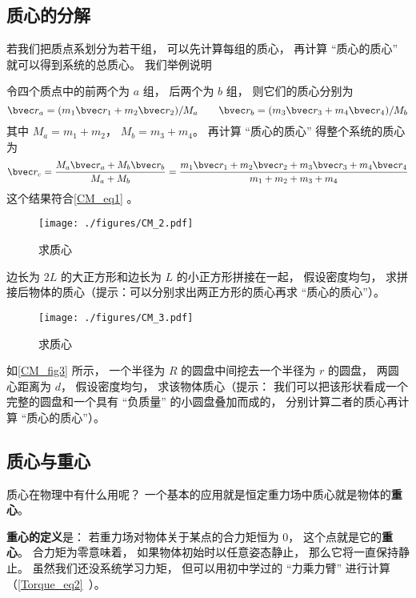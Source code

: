 \subsection{质心的分解}\label{CM_sub1}
若我们把质点系划分为若干组， 可以先计算每组的质心， 再计算 “质心的质心” 就可以得到系统的总质心。 我们举例说明
\begin{example}{}
令四个质点中的前两个为 $a$ 组， 后两个为 $b$ 组， 则它们的质心分别为
\begin{equation}
\bvec r_a = (m_1 \bvec r_1 + m_2 \bvec r_2)/M_a
\qquad
\bvec r_b = (m_3 \bvec r_3 + m_4 \bvec r_4)/M_b
\end{equation}
其中 $M_a = m_1 + m_2$， $M_b = m_3 + m_4$。 再计算 “质心的质心” 得整个系统的质心为
\begin{equation}
\bvec r_c = \frac{M_a \bvec r_a + M_b \bvec r_b}{M_a + M_b} = \frac{m_1 \bvec r_1 + m_2 \bvec r_2 + m_3 \bvec r_3 + m_4 \bvec r_4}{m_1 + m_2 + m_3 + m_4}
\end{equation}
这个结果符合\autoref{CM_eq1} 。
\end{example}

\begin{exercise}{}
\begin{figure}[ht]
\centering
\texttt{[image: ./figures/CM\_2.pdf]}
\caption{求质心} \label{CM_fig2}
\end{figure}
边长为 $2L$ 的大正方形和边长为 $L$ 的小正方形拼接在一起， 假设密度均匀， 求拼接后物体的质心（提示：可以分别求出两正方形的质心再求 “质心的质心”）。
\end{exercise}

\begin{exercise}{}
\begin{figure}[ht]
\centering
\texttt{[image: ./figures/CM\_3.pdf]}
\caption{求质心} \label{CM_fig3}
\end{figure}
如\autoref{CM_fig3} 所示， 一个半径为 $R$ 的圆盘中间挖去一个半径为 $r$ 的圆盘， 两圆心距离为 $d$， 假设密度均匀， 求该物体质心（提示： 我们可以把该形状看成一个完整的圆盘和一个具有 “负质量” 的小圆盘叠加而成的， 分别计算二者的质心再计算 “质心的质心”）。
\end{exercise}

\subsection{质心与重心}
质心在物理中有什么用呢？ 一个基本的应用就是恒定重力场中质心就是物体的\textbf{重心}。

\textbf{重心的定义}是： 若重力场对物体关于某点的合力矩恒为 0， 这个点就是它的\textbf{重心}。 合力矩为零意味着， 如果物体初始时以任意姿态静止， 那么它将一直保持静止。 虽然我们还没系统学习力矩， 但可以用初中学过的 “力乘力臂” 进行计算（\autoref{Torque_eq2}~）。

